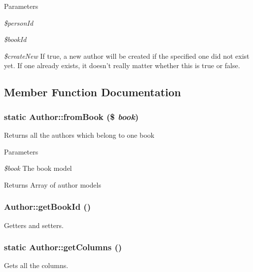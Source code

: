 \begin{DoxyParams}{Parameters}
\item[{\em \$personId}]\item[{\em \$bookId}]\item[{\em \$createNew}]If true, a new author will be created if the specified one did not exist yet. If one already exists, it doesn't really matter whether this is true or false. \end{DoxyParams}


\subsection{Member Function Documentation}
\hypertarget{classAuthor_a28e3a2452148b8099d0075d88bf21b66}{
\subsubsection[{fromBook}]{\setlength{\rightskip}{0pt plus 5cm}static Author::fromBook (\$ {\em book})}}
\label{classAuthor_a28e3a2452148b8099d0075d88bf21b66}
Returns all the authors which belong to one book


\begin{DoxyParams}{Parameters}
\item[{\em \$book}]The book model \end{DoxyParams}
\begin{DoxyReturn}{Returns}
Array of author models 
\end{DoxyReturn}
\hypertarget{classAuthor_a5f4d6e520feb52f072417b1ae445eabc}{
\subsubsection[{getBookId}]{\setlength{\rightskip}{0pt plus 5cm}Author::getBookId ()}}
\label{classAuthor_a5f4d6e520feb52f072417b1ae445eabc}
Getters and setters. \hypertarget{classAuthor_aa3e40fdf422c171a8e307725ca5ff05c}{
\subsubsection[{getColumns}]{\setlength{\rightskip}{0pt plus 5cm}static Author::getColumns ()}}
\label{classAuthor_aa3e40fdf422c171a8e307725ca5ff05c}
Gets all the columns.

